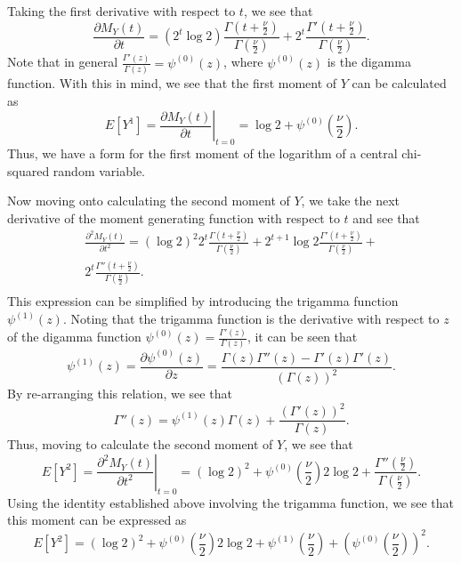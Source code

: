 Taking the first derivative with respect to $t$, we see that
\begin{equation}
	\frac{\partial M_Y(t)}{\partial t} = (2^t \log 2) \frac{\Gamma (t + \frac{\nu}{2})}{\Gamma (\frac{\nu}{2})} + 2^t \frac{\Gamma ' (t + \frac{\nu}{2})}{\Gamma (\frac{\nu}{2})} .
\end{equation}
Note that in general $\frac{\Gamma ' (z)}{\Gamma (z)} = \psi^{(0)}(z)$, where $\psi^{(0)}(z)$ is the digamma function. With this in mind, we see that the first moment of
$Y$ can be calculated as
\begin{equation}
	E \left[ Y^1 \right] =  \left. \frac{\partial M_Y(t)}{\partial t} \right|_{t=0} = \log 2 + \psi^{(0)} \left( \frac{\nu}{2} \right) .
\end{equation}
Thus, we have a form for the first moment of the logarithm of a central chi-squared random variable.

Now moving onto calculating the second moment of $Y$, we take the next derivative of the moment generating function with respect to $t$ and see that
\begin{equation}
	\begin{split}
		\frac{\partial^2 M_Y(t)}{\partial t^2} = (\log 2)^2 2^t  \frac{\Gamma (t + \frac{\nu}{2})}{\Gamma (\frac{\nu}{2})} + 2^{t+1} \log 2 \frac{\Gamma ' (t + \frac{\nu}{2})}{\Gamma (\frac{\nu}{2})} + \\ 
		2^t \frac{\Gamma '' (t + \frac{\nu}{2})}{\Gamma (\frac{\nu}{2})} .\\
	\end{split}
\end{equation}
This expression can be simplified by introducing the trigamma function $ \psi^{(1)}(z)$. Noting that the trigamma function is the derivative with respect
to $z$ of the digamma function $\psi^{(0)}(z) = \frac{\Gamma ' (z)}{\Gamma (z)}$, it can be seen that
\begin{equation}
	\psi^{(1)}(z) = \frac{\partial \psi^{(0)}(z)}{\partial z} = \frac{\Gamma (z) \Gamma '' (z) - \Gamma '(z) \Gamma '(z)}{(\Gamma(z))^2} .
\end{equation}
By re-arranging this relation, we see that
\begin{equation}
	\Gamma ''(z) = \psi^{(1)}(z) \Gamma(z) + \frac{(\Gamma '(z))^2}{\Gamma(z)} .
\end{equation}
Thus, moving to calculate the second moment of $Y$, we see that
\begin{equation}
	E \left[ Y^2 \right] =  \left. \frac{\partial^2 M_Y(t)}{\partial t^2} \right|_{t=0} =
	(\log 2)^2 + \psi^{(0)} \left( \frac{\nu}{2} \right) 2 \log 2  + \frac{\Gamma '' (\frac{\nu}{2})}{\Gamma (\frac{\nu}{2})} .
\end{equation}
Using the identity established above involving the trigamma function, we see that this moment can be expressed as
\begin{equation}
	E \left[ Y^2 \right] =
	(\log 2)^2 + \psi^{(0)} \left( \frac{\nu}{2} \right) 2 \log 2  + \psi^{(1)} \left( \frac{\nu}{2} \right) + \left( \psi^{(0)} \left( \frac{\nu}{2} \right) \right)^2 .
\end{equation}

